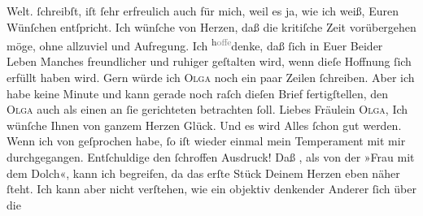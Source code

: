 \begin{ledgroupsized}[t]{13cm}
{{{                  Welt.}}}\label{K_L03097-2h} ſchreibſt, iſt ſehr erfreulich auch für mich, weil es ja, wie ich
               weiß, Euren Wünſchen entſpricht. Ich wünſche von Herzen, daß die kritiſche Zeit
               vorübergehen möge, ohne  allzuviel \label{K_L03097-3v}\label{K_L03097-3h} und Aufregung. Ich \substVorne{}\textsuperscript{h\textcolor{gray}{offe}}\substDazwischen{}denke\substHinten{}, daß ſich in Euer Beider Leben Manches freundlicher {\pb}und ruhiger geſtalten wird, wenn dieſe Hoffnung ſich
               erfüllt haben wird. Gern würde ich \textsc{Olga} noch ein paar
               Zeilen ſchreiben. Aber ich habe keine Minute und kann gerade noch raſch dieſen Brief
               fertigſtellen, den \textsc{Olga} auch als einen an ſie gerichteten
               betrachten ſoll. Liebes Fräulein \textsc{Olga}, Ich wünſche Ihnen
               von ganzem Herzen Glück. Und es wird Alles ſchon gut werden.\pend
           \pstart
           Wenn ich von \label{K_L03097-5v}\label{K_L03097-5h} geſprochen habe, ſo iſt wieder einmal mein Temperament mit mir durchgegangen.
               Entſchuldige den ſchroffen {\pb}Ausdruck! Daß \label{K_L03097-11v}\label{K_L03097-11h}, als von der »Frau mit dem Dolch«, kann
               ich begreifen, da das erſte Stück Deinem Herzen eben näher ſteht. Ich kann aber nicht verſtehen, wie ein
               objektiv denkender  Anderer ſich über die

\end{ledgroupsized}

